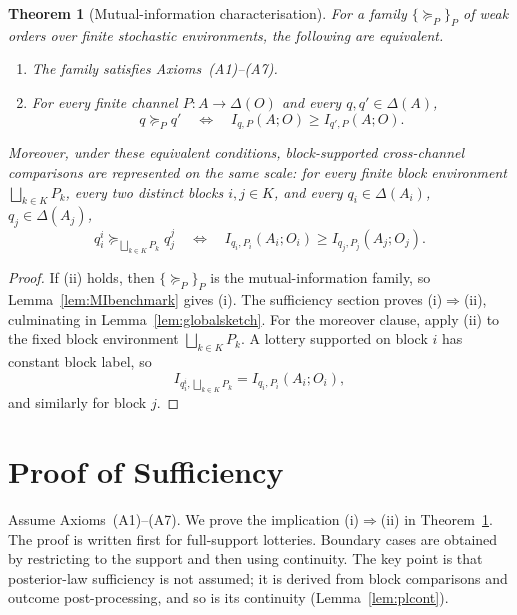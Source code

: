 \documentclass[11pt,a4paper]{article}
\newtheorem{theorem}{Theorem}
\theoremstyle{definition}
\newcommand{\1}{\mathbf 1}
\begin{document}
\begin{theorem}[Mutual-information characterisation]\label{thm:main}
For a family $\{\succeq_P\}_P$ of weak orders over finite stochastic environments, the following are equivalent.
\begin{enumerate}[label=\textup{(\roman*)},leftmargin=*]
\item The family satisfies Axioms~\textup{(A1)--(A7)}.
\item For every finite channel $P:A\to\Delta(O)$ and every $q,q'\in\Delta(A)$,
\[
q\succeq_P q'
\quad\Longleftrightarrow\quad
I_{q,P}(A;O)\ge I_{q',P}(A;O).
\]
\end{enumerate}
Moreover, under these equivalent conditions, block-supported cross-channel comparisons are represented on the same
scale: for every finite block environment $\bigsqcup_{k\in K}P_k$, every two distinct blocks $i,j\in K$, and every
$q_i\in\Delta(A_i)$, $q_j\in\Delta(A_j)$,
\[
q_i^i\succeq_{\bigsqcup_{k\in K}P_k}q_j^j
\quad\Longleftrightarrow\quad
I_{q_i,P_i}(A_i;O_i)\ge I_{q_j,P_j}(A_j;O_j).
\]
\end{theorem}

\begin{proof}
If \textup{(ii)} holds, then $\{\succeq_P\}_P$ is the mutual-information family, so
Lemma~\ref{lem:MIbenchmark} gives \textup{(i)}.  The sufficiency section proves \textup{(i)$\Rightarrow$(ii)},
culminating in Lemma~\ref{lem:globalsketch}.  For the moreover clause, apply
\textup{(ii)} to the fixed block environment $\bigsqcup_{k\in K}P_k$.  A lottery supported on block $i$ has constant
block label, so
\[
I_{q_i^i,\bigsqcup_{k\in K}P_k}=I_{q_i,P_i}(A_i;O_i),
\]
and similarly for block $j$.
\end{proof}

\section*{Proof of Sufficiency}

Assume Axioms~\textup{(A1)--(A7)}.  We prove the implication \textup{(i)$\Rightarrow$(ii)} in
Theorem~\ref{thm:main}.  The proof is written first for full-support lotteries.  Boundary cases are obtained by
restricting to the support and then using continuity.  The key point is that posterior-law sufficiency is not assumed; it
is derived from block comparisons and outcome post-processing, and so is its continuity
(Lemma~\ref{lem:plcont}).
\end{document}
